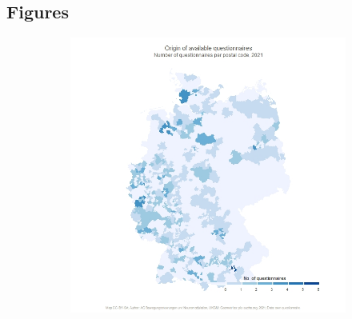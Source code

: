 \documentclass{bmcart}
\begin{document}
\begin{backmatter}
		
		
		
\newpage
\section*{Figures}
\begin{figure}[h!]
    \centering
    \begin{subfigure}[b]{0.35\linewidth}
        \includegraphics[width=.90\textwidth]{available.questionnaires.jpeg}
        \label{fig1:questionnaires}
    \end{subfigure}%
    \begin{subfigure}[b]{0.35\linewidth}

\end{subfigure}
\end{figure}
\end{backmatter}
\end{document}
